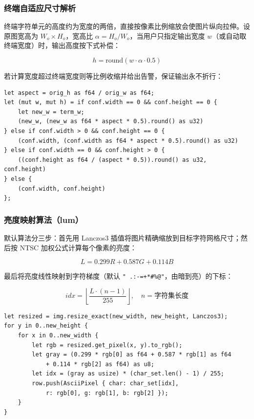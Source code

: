 \documentclass{SYSUReport}
\begin{document}
\subsubsection{终端自适应尺寸解析}

终端字符单元的高度约为宽度的两倍，直接按像素比例缩放会使图片纵向拉伸。设原图宽高为 $W_o \times H_o$，宽高比 $\alpha = H_o / W_o$，当用户只指定输出宽度 $w$（或自动取终端宽度）时，输出高度按下式补偿：

\begin{equation}
    h = \mathrm{round}(w \cdot \alpha \cdot 0.5)
\end{equation}

若计算宽度超过终端宽度则等比例收缩并给出告警，保证输出永不折行：

\begin{lstlisting}[caption={尺寸解析核心逻辑（app.rs）}]
let aspect = orig_h as f64 / orig_w as f64;
let (mut w, mut h) = if conf.width == 0 && conf.height == 0 {
    let new_w = term_w;
    (new_w, (new_w as f64 * aspect * 0.5).round() as u32)
} else if conf.width > 0 && conf.height == 0 {
    (conf.width, (conf.width as f64 * aspect * 0.5).round() as u32)
} else if conf.width == 0 && conf.height > 0 {
    ((conf.height as f64 / (aspect * 0.5)).round() as u32, conf.height)
} else {
    (conf.width, conf.height)
};
\end{lstlisting}

\subsubsection{亮度映射算法（lum）}

默认算法分三步：首先用 Lanczos3 插值将图片精确缩放到目标字符网格尺寸；然后按 NTSC 加权公式计算每个像素的亮度：

\begin{equation}
    L = 0.299R + 0.587G + 0.114B
\end{equation}

最后将亮度线性映射到字符梯度（默认 \verb|" .:-=+*#%@"|，由暗到亮）的下标：

\begin{equation}
    idx = \left\lfloor \frac{L \cdot (n-1)}{255} \right\rfloor, \quad n = \text{字符集长度}
\end{equation}

\begin{lstlisting}[caption={亮度映射核心循环（ascii/lum.rs）}]
let resized = img.resize_exact(new_width, new_height, Lanczos3);
for y in 0..new_height {
    for x in 0..new_width {
        let rgb = resized.get_pixel(x, y).to_rgb();
        let gray = (0.299 * rgb[0] as f64 + 0.587 * rgb[1] as f64
            + 0.114 * rgb[2] as f64) as u8;
        let idx = (gray as usize) * (char_set.len() - 1) / 255;
        row.push(AsciiPixel { char: char_set[idx],
            r: rgb[0], g: rgb[1], b: rgb[2] });
    }
}
\end{lstlisting}
\end{document}
